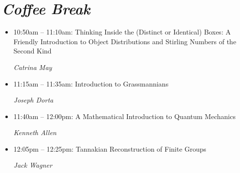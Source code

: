 \documentclass[oneside]{amsart}
\begin{document}
\section*{\textit{Coffee Break}}
\vspace{0.5em}
\begin{itemize}
\setlength\itemsep{1em}

\item 10:50am -- 11:10am: Thinking Inside the (Distinct or Identical) Boxes: A Friendly Introduction to Object Distributions and Stirling Numbers of the Second Kind \\ \vspace{-1.5em} \begin{flushright}\textit{ Catrina May }\end{flushright}
\item 11:15am -- 11:35am: Introduction to Grassmannians  \\ \vspace{-1.5em} \begin{flushright}\textit{ Joseph Dorta }\end{flushright}
\item 11:40am -- 12:00pm: A Mathematical Introduction to Quantum Mechanics \\ \vspace{-1.5em} \begin{flushright}\textit{ Kenneth Allen }\end{flushright}
\item 12:05pm -- 12:25pm: Tannakian Reconstruction of Finite Groups \\ \vspace{-1.5em} \begin{flushright}\textit{ Jack Wagner }\end{flushright}

\end{itemize}
\end{document}
